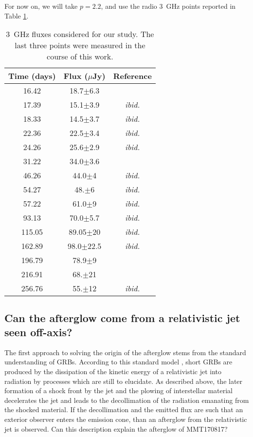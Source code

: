 For now on, we will take $p = 2.2$, and use the radio 3~GHz points reported in Table \ref{radio}.

\begin{table}
\begin{center}
\begin{tabular}{c|c|c}
\bf{Time (days)} & \bf{Flux ($\mu$Jy)} & \bf{Reference}\\
\hline
16.42 & 18.7$\pm$6.3 & \citet{12}\\
17.39 & 15.1$\pm$3.9 & \it{ibid.}\\
18.33 & 14.5$\pm$3.7 & \it{ibid.}\\
22.36 & 22.5$\pm$3.4 & \it{ibid.}\\
24.26 &  25.6$\pm$2.9 & \it{ibid.}\\
31.22 & 34.0$\pm$3.6 & \citet{5}\\
46.26 & 44.0$\pm$4 & \it{ibid.}\\
54.27 &  48.$\pm$6 & \it{ibid.}\\
57.22 & 61.0$\pm$9 & \it{ibid.}\\
93.13 & 70.0$\pm$5.7 & \it{ibid.}\\
115.05 & 89.05$\pm$20 & \it{ibid.}\\
162.89 & 98.0$\pm$22.5 & \it{ibid.}\\
196.79 & 78.9$\pm$9 & \citet{10}\\
216.91 & 68.$\pm$21 & \citet{17}\\
256.76 & 55.$\pm$12 & \it{ibid.} \\


\end{tabular}
\caption[3~GHz fluxes considered for our study]{3~GHz fluxes considered for our study. The last three points were measured in the course of this work.}
\label{radio}
\end{center}
\end{table}

\subsection{Can the afterglow come from a relativistic jet seen off-axis?}
The first approach to solving the origin of the afterglow stems from the standard understanding of GRBs. According to this standard model \citep[see e.g][sec. 5]{27, 28, 26}, short GRBs are produced by the dissipation of the kinetic energy of a relativistic jet into radiation by processes which are still to elucidate. As described above, the later formation of a shock front by the jet and the plowing of interstellar material decelerates the jet and leads to the decollimation of the radiation emanating from the shocked material. If the decollimation and the emitted flux are such that an exterior observer enters the emission cone, than an afterglow from the relativistic jet is observed. Can this description explain the afterglow of MMT170817?



